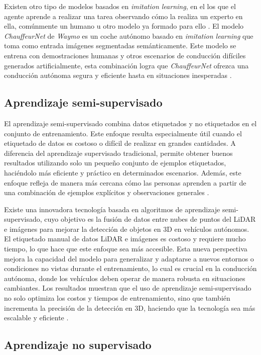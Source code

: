Existen otro tipo de modelos basados en \textit{imitation learning}, en el los que el agente aprende a realizar una tarea observando cómo la realiza un experto en ella, comúnmente un humano u otro modelo ya formado para ello \cite{imitation-learning}. El modelo \textit{ChauffeurNet} de \textit{Waymo} es un coche autónomo basado en \textit{imitation learning} que toma como entrada imágenes segmentadas semánticamente. Este modelo se entrena con demostraciones humanas y otros escenarios de conducción difíciles generados artificialmente, esta combinación logra que \textit{ChauffeurNet} ofrezca una conducción autónoma segura y eficiente hasta en situaciones inesperadas \cite{chauffeurnet-paper}.

\subsection{Aprendizaje semi-supervisado}

El aprendizaje semi-supervisado combina datos etiquetados y no etiquetados en el conjunto de entrenamiento. Este enfoque resulta especialmente útil cuando el etiquetado de datos es costoso o difícil de realizar en grandes cantidades. A diferencia del aprendizaje supervisado tradicional, permite obtener buenos resultados utilizando solo un pequeño conjunto de ejemplos etiquetados, haciéndolo más eficiente y práctico en determinados escenarios. Además, este enfoque refleja de manera más cercana cómo las personas aprenden a partir de una combinación de ejemplos explícitos y observaciones generales \cite{semi}.

Existe una innovadora tecnología basada en algoritmos de aprendizaje semi-supervisado, cuyo objetivo es la fusión de datos entre nubes de puntos del \ac{LiDAR} e imágenes para mejorar la detección de objetos en 3D en vehículos autónomos. El etiquetado manual de datos \ac{LiDAR} e imágenes es costoso y requiere mucho tiempo, lo que hace que este enfoque sea más accesible. Esta nueva perspectiva mejora la capacidad del modelo para generalizar y adaptarse a nuevos entornos o condiciones no vistas durante el entrenamiento, lo cual es crucial en la conducción autónoma, donde los vehículos deben operar de manera robusta en situaciones cambiantes. Los resultados muestran que el uso de aprendizaje semi-supervisado no solo optimiza los costos y tiempos de entrenamiento, sino que también incrementa la precisión de la detección en 3D, haciendo que la tecnología sea más escalable y eficiente \cite{semi-ex}.

\subsection{Aprendizaje no supervisado}

